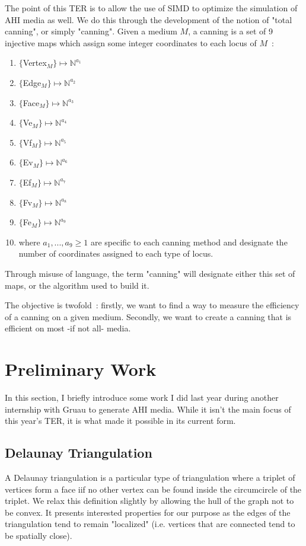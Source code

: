 \documentclass{article}
\begin{document}
The point of this TER is to allow the use of SIMD to optimize the simulation of AHI media as well. We do this through the development of the notion of "total canning", or simply "canning". Given a medium $M$, a canning is a set of 9 injective maps which assign some integer coordinates to each locus of $M$~:
\begin{enumerate}
	\item $\{$Vertex$_M\} \mapsto \mathbb{N}^{a_1}$
	\item $\{$Edge$_M\} \mapsto \mathbb{N}^{a_2}$
	\item $\{$Face$_M\} \mapsto \mathbb{N}^{a_3}$
	\item $\{$Ve$_M\} \mapsto \mathbb{N}^{a_4}$
	\item $\{$Vf$_M\} \mapsto \mathbb{N}^{a_5}$
	\item $\{$Ev$_M\} \mapsto \mathbb{N}^{a_6}$
	\item $\{$Ef$_M\} \mapsto \mathbb{N}^{a_7}$
	\item $\{$Fv$_M\} \mapsto \mathbb{N}^{a_8}$
	\item $\{$Fe$_M\} \mapsto \mathbb{N}^{a_9}$
	\item[] where $a_1, ..., a_9 \geq 1$ are specific to each canning method and designate the number of coordinates assigned to each type of locus.
\end{enumerate}
Through misuse of language, the term "canning" will designate either this set of maps, or the algorithm used to build it.

The objective is twofold~: firstly, we want to find a way to measure the efficiency of a canning on a given medium. Secondly, we want to create a canning that is efficient on most -if not all- media.

\section{Preliminary Work}

In this section, I briefly introduce some work I did last year during another internship with Gruau to generate AHI media. While it isn't the main focus of this year's TER, it is what made it possible in its current form.

\subsection{Delaunay Triangulation}

A Delaunay triangulation is a particular type of triangulation where a triplet of vertices form a face iif no other vertex can be found inside the circumcircle of the triplet. We relax this definition slightly by allowing the hull of the graph not to be convex. It presents interested properties for our purpose as the edges of the triangulation tend to remain "localized" (i.e. vertices that are connected tend to be spatially close).
\end{document}
